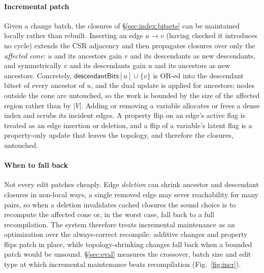 \paragraph{Incremental patch}
Given a change batch, the closures of \S\ref{sec:index:bitsets} can be maintained
locally rather than rebuilt. Inserting an edge $u\!\to\!v$ (having checked it
introduces no cycle) extends the CSR adjacency and then propagates closures over
only the \emph{affected cone}: $u$ and its ancestors gain $v$ and its descendants
as new descendants, and symmetrically $v$ and its descendants gain $u$ and its
ancestors as new ancestors. Concretely, $\textsf{descendantBits}[u]\cup\{v\}$ is
OR-ed into the descendant bitset of every ancestor of $u$, and the dual update is
applied for ancestors; nodes outside the cone are untouched, so the work is
bounded by the size of the affected region rather than by $|V|$. Adding or
removing a variable allocates or frees a dense index and scrubs its incident
edges. A property flip on an edge's \textsf{active} flag is treated as an edge
insertion or deletion, and a flip of a variable's \textsf{latent} flag is a
property-only update that leaves the topology, and therefore the closures,
untouched.

\paragraph{When to fall back}
Not every edit patches cheaply. Edge \emph{deletion} can shrink ancestor and
descendant closures in non-local ways, a single removed edge may sever
reachability for many pairs, so when a deletion invalidates cached closures the
sound choice is to recompute the affected cone or, in the worst case, fall back to
a full recompilation. The system therefore treats incremental maintenance as an
optimization over the always-correct recompile: additive changes and property
flips patch in place, while topology-shrinking changes fall back when a bounded
patch would be unsound. \S\ref{sec:eval} measures the crossover, batch size and
edit type at which incremental maintenance beats recompilation
(Fig.~\ref{fig:incr}).

